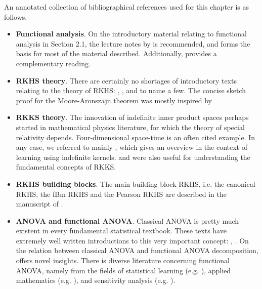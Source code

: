 \documentclass[a4paper,showframe]{report}
\begin{document}
An annotated collection of bibliographical references used for this chapter is as follows.
\begin{itemize}
  \item \textbf{Functional analysis}. On the introductory material relating to functional analysis in Section 2.1, the lecture notes by \citet{sejdinovic2012} is recommended, and forms the basis for most of the material described. Additionally, \citet{rudin1987real} provides a complementary reading.
  \item \textbf{RKHS theory}. There are certainly no shortages of introductory texts relating to the theory of RKHS: \citet{steinwart2008support}, \citet{berlinet2011reproducing}, and \citet{gu2013smoothing} to name a few. The concise sketch proof for the Moore-Aronszajn theorem was mostly inspired by \citet[Theorem 4]{hein2004kernels}
  \item \textbf{RKKS theory}. The innovation of indefinite inner product spaces perhaps started in mathematical physics literature, for which the theory of special relativity depends. Four-dimensional space-time is an often cited example. In any case, we referred to mainly \citet{ong2004learning}, which gives an overview in the context of learning using indefinite kernels. \citet{alpay1991some} and \citet{zafeiriou2012subspace} were also useful for understanding the fundamental concepts of RKKS.
  \item \textbf{RKHS building blocks}. The main building block RKHS, i.e. the canonical RKHS, the fBm RKHS and the Pearson RKHS are described in the manuscript of \citet{bergsma2017}.
  \item \textbf{ANOVA and functional ANOVA}. 
  Classical ANOVA is pretty much existent in every fundamental statistical textbook. These texts have extremely well written introductions to this very important concept: \citet[Ch. 11]{casella2002statistical}, \citet[Ch. 3]{dean1999design}. 
  On the relation between classical ANOVA and functional ANOVA decomposition, \citet{gu2013smoothing} offers novel insights. There is diverse literature concerning functional ANOVA, namely from the fields of statistical learning (e.g. \cite{wahba1990spline}), applied mathematics (e.g. \cite{kuo2010decompositions}), and sensitivity analysis (e.g. \cite{sobol2001global,durrande2013anova}). 
\end{itemize}

\hClosingStuffStandalone
\end{document}
